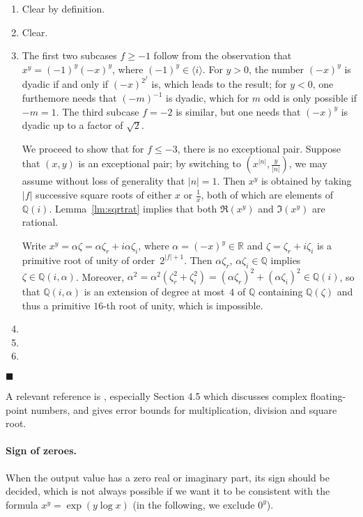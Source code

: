 \documentclass {article}
\newcommand {\Q}{\mathbb Q}
\newcommand {\R}{\mathbb R}
\renewcommand {\leq}{\leqslant}
\renewcommand {\geq}{\geqslant}
\newenvironment{proof}{\noindent{\bf Proof:}}{{\hspace* {\fill}$\blacksquare$}}
\begin{document}
\begin {proof}
\begin {enumerate}
\item
Clear by definition.
\item
Clear.
\item
The first two subcases $f \geq -1$ follow from the observation that
$x^y = (-1)^y (-x)^y$, where $(-1)^y \in \langle i \rangle$.
For $y > 0$, the number $(-x)^y$ is dyadic if and only if $(-x)^{2^f}$ is,
which leads to the result; for $y < 0$, one furthemore needs that
$(-m)^{-1}$ is dyadic, which for $m$ odd is only possible if $-m = 1$.
The third subcase $f = -2$ is similar, but one needs that $(-x)^y$ is dyadic
up to a factor of $\sqrt 2$.

We proceed to show that for $f \leq -3$, there is no exceptional pair.
Suppose that $(x, y)$ is an exceptional pair; by switching to
$\left( x^{|n|}, \frac {y}{|n|} \right)$, we may assume
without loss of generality that $|n| = 1$. Then $x^y$ is obtained by
taking $|f|$ successive square roots of either $x$ or $\frac {1}{x}$, both
of which are elements of $\Q (i)$. Lemma~\ref {lm:sqrtrat} implies
that both $\Re (x^y)$ and $\Im (x^y)$ are rational.

Write $x^y = \alpha \zeta = \alpha \zeta_r + i \alpha \zeta_i$, where
$\alpha = (-x)^y \in \R$ and $\zeta = \zeta_r + i \zeta_i$ is a primitive root
of unity of order~$2^{|f| + 1}$.
Then $\alpha \zeta_r$, $\alpha \zeta_i \in \Q$ implies $\zeta \in \Q (i, \alpha)$.
Moreover,
$\alpha^2 = \alpha^2 (\zeta_r^2 + \zeta_i^2) =
(\alpha \zeta_r)^2 + (\alpha \zeta_i)^2 \in \Q (i)$, so that $\Q (i, \alpha)$
is an extension of degree at most~$4$ of $\Q$ containing $\Q (\zeta)$
and thus a primitive $16$-th root of unity, which is impossible.
\item
\item
\item
\end {enumerate}
\end {proof}

A relevant reference is \cite{BrDiJeLeMeMuReStTo09}, especially Section 4.5
which discusses complex floating-point numbers, and gives error bounds for
multiplication, division and square root.

\paragraph{Sign of zeroes.}
When the output value has a zero real or imaginary part, its sign should be
decided, which is not always possible if we want it to be consistent with the
formula $x^y = \exp(y\log x)$ (in the following, we exclude $0^y$).
\end{document}

